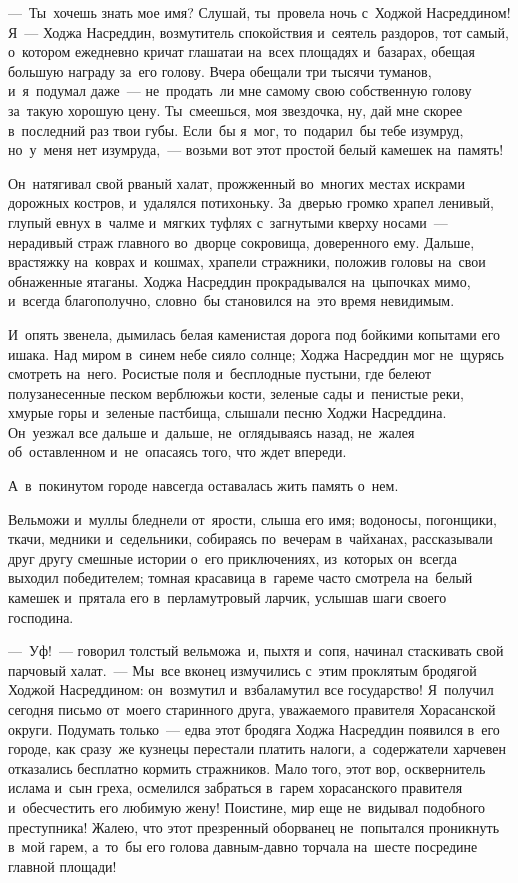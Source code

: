\documentclass[12pt,a4paper]{book}
\begin{document}
—~Ты~хочешь знать мое имя? Слушай, ты~провела ночь с~Ходжой Насреддином! Я~— Ходжа Насреддин, возмутитель спокойствия и~сеятель раздоров, тот самый, о~котором ежедневно кричат глашатаи на~всех площадях и~базарах, обещая большую награду за~его голову. Вчера обещали три тысячи туманов, и~я~подумал даже~— не~продать~ли мне самому свою собственную голову за~такую хорошую цену. Ты~смеешься, моя звездочка, ну, дай мне скорее в~последний раз твои губы. Если~бы я~мог, то~подарил~бы тебе изумруд, но~у~меня нет изумруда,~— возьми вот этот простой белый камешек на~память!

Он~натягивал свой рваный халат, прожженный во~многих местах искрами дорожных костров, и~удалялся потихоньку. За~дверью громко храпел ленивый, глупый евнух в~чалме и~мягких туфлях с~загнутыми кверху носами~— нерадивый страж главного во~дворце сокровища, доверенного ему. Дальше, врастяжку на~коврах и~кошмах, храпели стражники, положив головы на~свои обнаженные ятаганы. Ходжа Насреддин прокрадывался на~цыпочках мимо, и~всегда благополучно, словно~бы становился на~это время невидимым.

И~опять звенела, дымилась белая каменистая дорога под бойкими копытами его ишака. Над миром в~синем небе сияло солнце; Ходжа Насреддин мог не~щурясь смотреть на~него. Росистые поля и~бесплодные пустыни, где белеют полузанесенные песком верблюжьи кости, зеленые сады и~пенистые реки, хмурые горы и~зеленые пастбища, слышали песню Ходжи Насреддина. Он~уезжал все дальше и~дальше, не~оглядываясь назад, не~жалея об~оставленном и~не~опасаясь того, что ждет впереди.

А~в~покинутом городе навсегда оставалась жить память о~нем.

Вельможи и~муллы бледнели от~ярости, слыша его имя; водоносы, погонщики, ткачи, медники и~седельники, собираясь по~вечерам в~чайханах, рассказывали друг другу смешные истории о~его приключениях, из~которых он~всегда выходил победителем; томная красавица в~гареме часто смотрела на~белый камешек и~прятала его в~перламутровый ларчик, услышав шаги своего господина.

—~Уф!~— говорил толстый вельможа~и, пыхтя и~сопя, начинал стаскивать свой парчовый халат.~— Мы~все вконец измучились с~этим проклятым бродягой Ходжой Насреддином: он~возмутил и~взбаламутил все государство! Я~получил сегодня письмо от~моего старинного друга, уважаемого правителя Хорасанской округи. Подумать только~— едва этот бродяга Ходжа Насреддин появился в~его городе, как сразу~же кузнецы перестали платить налоги, а~содержатели харчевен отказались бесплатно кормить стражников. Мало того, этот вор, осквернитель ислама и~сын греха, осмелился забраться в~гарем хорасанского правителя и~обесчестить его любимую жену! Поистине, мир еще не~видывал подобного преступника! Жалею, что этот презренный оборванец не~попытался проникнуть в~мой гарем, а~то~бы его голова давным-давно торчала на~шесте посредине главной площади!
\end{document}
